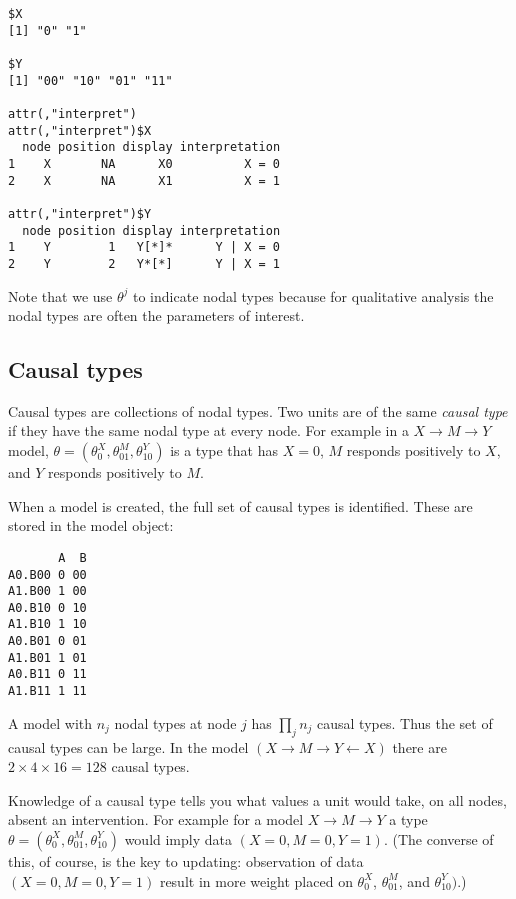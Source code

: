 \documentclass[
  12pt,
]{book}
\newenvironment{Shaded}{\begin{snugshade}}{\end{snugshade}}
\newcommand{\FunctionTok}[1]{\textcolor[rgb]{0.13,0.29,0.53}{\textbf{#1}}}
\newcommand{\NormalTok}[1]{#1}
\newcommand{\SpecialCharTok}[1]{\textcolor[rgb]{0.81,0.36,0.00}{\textbf{#1}}}
\newcommand{\StringTok}[1]{\textcolor[rgb]{0.31,0.60,0.02}{#1}}
\begin{document}
\begin{verbatim}
$X
[1] "0" "1"

$Y
[1] "00" "10" "01" "11"

attr(,"interpret")
attr(,"interpret")$X
  node position display interpretation
1    X       NA      X0          X = 0
2    X       NA      X1          X = 1

attr(,"interpret")$Y
  node position display interpretation
1    Y        1   Y[*]*      Y | X = 0
2    Y        2   Y*[*]      Y | X = 1
\end{verbatim}

Note that we use \(\theta^j\) to indicate nodal types because for qualitative analysis the nodal types are often the parameters of interest.

\hypertarget{causal-types}{%
\subsection{Causal types}\label{causal-types}}

Causal types are collections of nodal types. Two units are of the same \emph{causal type} if they have the same nodal type at every node. For example in a \(X \rightarrow M \rightarrow Y\) model, \(\theta = (\theta^X_0, \theta^M_{01}, \theta^Y_{10})\) is a type that has \(X=0\), \(M\) responds positively to \(X\), and \(Y\) responds positively to \(M\).

When a model is created, the full set of causal types is identified. These are stored in the model object:

\begin{Shaded}
\end{Shaded}

\begin{verbatim}
       A  B
A0.B00 0 00
A1.B00 1 00
A0.B10 0 10
A1.B10 1 10
A0.B01 0 01
A1.B01 1 01
A0.B11 0 11
A1.B11 1 11
\end{verbatim}

A model with \(n_j\) nodal types at node \(j\) has \(\prod_jn_j\) causal types. Thus the set of causal types can be large. In the model \((X\rightarrow M \rightarrow Y \leftarrow X)\) there are \(2\times 4\times 16 = 128\) causal types.

Knowledge of a causal type tells you what values a unit would take, on all nodes, absent an intervention. For example for a model \(X \rightarrow M \rightarrow Y\) a type \(\theta = (\theta^X_0, \theta^M_{01}, \theta^Y_{10})\) would imply data \((X=0, M=0, Y=1)\). (The converse of this, of course, is the key to updating: observation of data \((X=0, M=0, Y=1)\) result in more weight placed on \(\theta^X_0\), \(\theta^M_{01}\), and \(\theta^Y_{10})\).)
\end{document}

